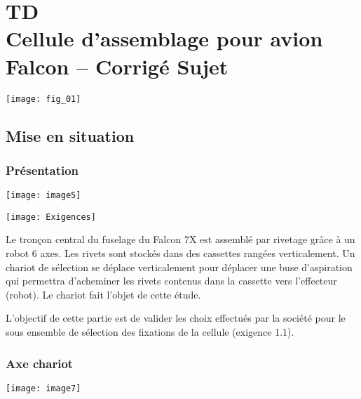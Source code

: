 \chapter*{TD  \\ 
Cellule d'assemblage pour avion Falcon -- \ifprof Corrigé \else Sujet \fi}
\ifprof {} \else  \fi
\setcounter{question}{0}

\begin{marginfigure}
\texttt{[image: fig\_01]}
\end{marginfigure}


\section*{Mise en situation}
\ifprof
\else

\subsection*{Présentation}\begin{center}
\texttt{[image: image5]}
\end{center} 


\begin{marginfigure}
\texttt{[image: Exigences]}
\end{marginfigure}


Le tronçon central du fuselage du Falcon 7X est assemblé par rivetage grâce à un robot 6 axes. Les rivets sont stockés dans des cassettes rangées verticalement. Un chariot de sélection se déplace verticalement pour déplacer une buse d'aspiration qui permettra d'acheminer les rivets contenus dans la cassette vers l'effecteur (robot). Le chariot fait l'objet de cette étude.


 
L'objectif de cette partie est de valider les choix effectués par la société pour le sous ensemble de sélection des fixations de la cellule (exigence 1.1).




 
\subsection*{Axe chariot}

\begin{marginfigure}
\texttt{[image: image7]}
\end{marginfigure}


